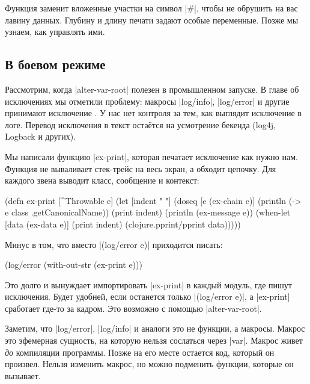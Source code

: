 Функция заменит вложенные участки на символ \spverb|#|, чтобы не обрушить на
вас лавину данных. Глубину и длину печати задают особые переменные. Позже мы
узнаем, как управлять ими.

\subsection{В боевом режиме}

\label{install-logger}


Рассмотрим, когда \spverb|alter-var-root| полезен в промышленном запуске. В
главе об исключениях мы отметили проблему: макросы \spverb|log/info|,
\spverb|log/error| и другие принимают исключение . У нас нет
контроля за тем, как выглядит исключение в логе. Перевод исключения в текст
оста\"{е}тся на усмотрение бекенда (log4j, Logback и других).

Мы написали функцию \spverb|ex-print|, которая печатает исключение как нужно
нам. Функция не вываливает стек-трейс на весь экран, а обходит цепочку. Для
каждого звена выводит класс, сообщение и контекст:

\begin{english}
  \begin{clojure}
(defn ex-print
  [^Throwable e]
  (let [indent "  "]
    (doseq [e (ex-chain e)]
      (println (-> e class .getCanonicalName))
      (print indent)
      (println (ex-message e))
      (when-let [data (ex-data e)]
        (print indent)
        (clojure.pprint/pprint data)))))
  \end{clojure}
\end{english}

\noindent
Минус в том, что вместо \spverb|(log/error e)| приходится писать:

\begin{english}
  \begin{clojure}
(log/error (with-out-str (ex-print e)))
  \end{clojure}
\end{english}

\noindent
Это долго и вынуждает импортировать \spverb|ex-print| в каждый модуль, где пишут
исключения. Будет удобней, если останется только \spverb|(log/error e)|, а
\spverb|ex-print| сработает где-то за кадром. Это возможно с помощью
\spverb|alter-var-root|.

Заметим, что \spverb|log/error|, \spverb|log/info| и аналоги это не функции, а
макросы. Макрос это эфемерная сущность, на которую нельзя сослаться через
\spverb|var|. Макрос живет \emph{до} компиляции программы. Позже на его месте
остается код, который он произвел. Нельзя изменить макрос, но можно подменить
функции, которые он вызывает.

